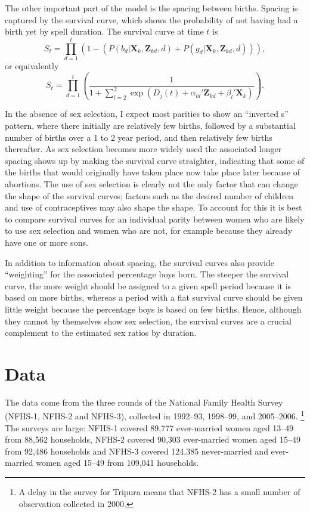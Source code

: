 \documentclass[12pt,letterpaper]{article}
\begin{document}
The other important part of the model is the spacing between births.
Spacing is captured by the survival curve, which shows the probability of not 
having had a birth yet by spell duration.
The survival curve at time $t$ is 
\begin{equation}
S_{t} 
= 
\prod_{d=1}^t 
\left( 
	1- \left(P(b_{d} | \mathbf{X}_{k}, \mathbf{Z}_{kd}, d) 
	+ P(g_{d} | \mathbf{X}_{k}, \mathbf{Z}_{kd}, d) \right) 
\right),
 \label{eq:survival}
\end{equation}
or equivalently
\begin{equation}
S_{t} 
= 
\prod_{d=1}^t
\left(
\frac{ 1 }
{1 + \sum_{l=2}^2 \exp(D_j(t) + \alpha_{ld}'\mathbf{Z}_{kd} + \beta_l'\mathbf{X}_{k})}
\right).
\end{equation}

In the absence of sex selection, I expect most parities to show an 
``inverted s'' pattern, where there initially are relatively few births, 
followed by a substantial number of births over a 1 to 2 year period, and then
relatively few births thereafter.
As sex selection becomes more widely used the associated
longer spacing shows up by making the survival curve straighter,
indicating that some of the births that would originally have taken place
now take place later because of abortions.
The use of sex selection is clearly not the only factor that can change the shape of
the survival curves; factors such as the desired number of children and
use of contraceptives may also shape the shape.
To account for this it is best to compare survival curves for an individual
parity between women who are likely to use sex selection and women who are
not, for example because they already have one or more sons.

In addition to information about spacing, the survival curves also provide 
``weighting'' for the associated percentage boys born.
The steeper the survival curve, the more weight should be assigned to a given
spell period because it is based on more births, 
whereas a period with a flat survival curve should be given little weight because the 
percentage boys is based on few births.
Hence, although they cannot by themselves show sex selection, the survival
curves are a crucial complement to the estimated sex ratios by duration.


\section{Data\label{sec:data}}

The data come from the three rounds of the National Family Health Survey 
(NFHS-1, NFHS-2 and NFHS-3),
collected in 1992--93, 1998--99, and 2005--2006.%
\footnote{
A delay in the survey for Tripura means that NFHS-2 has a small number of observation 
collected in 2000.
}
The surveys are large: NFHS-1 covered 89,777 ever-married women 
aged 13--49 from 88,562 households,
NFHS-2 covered 90,303 ever-married women aged 15--49 from 92,486 households
and NFHS-3 covered 124,385 never-married and ever-married women aged 
15--49 from 109,041 households.
\end{document}
